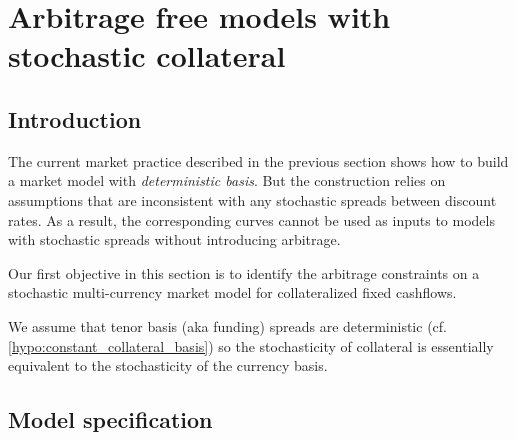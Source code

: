 \documentclass[11pt,english]{amsart}
\theoremstyle{definition}
\begin{document}
\newpage%
\section{Arbitrage free models with stochastic collateral}


\setcounter{subsection}{-1}
\subsection{Introduction}%
The current market practice described in the previous section shows how to build a market model with \emph{deterministic basis}. But the construction relies on assumptions that are inconsistent with any stochastic spreads between discount rates. As a result, the corresponding curves cannot be used as inputs to models with stochastic spreads without introducing arbitrage. 

Our first objective in this section is to identify the arbitrage constraints on a stochastic multi-currency market model for collateralized fixed cashflows. 



We assume that tenor basis (aka funding) spreads are deterministic (cf.  \autoref{hypo:constant_collateral_basis}) so the stochasticity of collateral is essentially equivalent to the stochasticity of the currency basis. 



\subsection{Model specification}%
\end{document}

